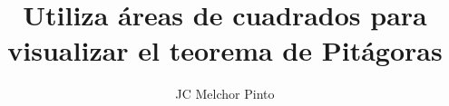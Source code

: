 \documentclass[12pt,addpoints,answers]{guia}
\title{Utiliza áreas de cuadrados para visualizar el teorema de Pitágoras}
\author{JC Melchor Pinto}
\begin{document}
\INFO%
\begin{multicols}{2}
    
    
    
\end{multicols}
\ejemplosboxed[]
\begin{questions}
    \questionboxed[20]{}
    \questionboxed[20]{}
    \ejemplosboxed[]
    \questionboxed[20]{}
    \ejemplosboxed[]
    \questionboxed[20]{}
    \ejemplosboxed[]
    \questionboxed[20]{}
\end{questions}
\end{document}
